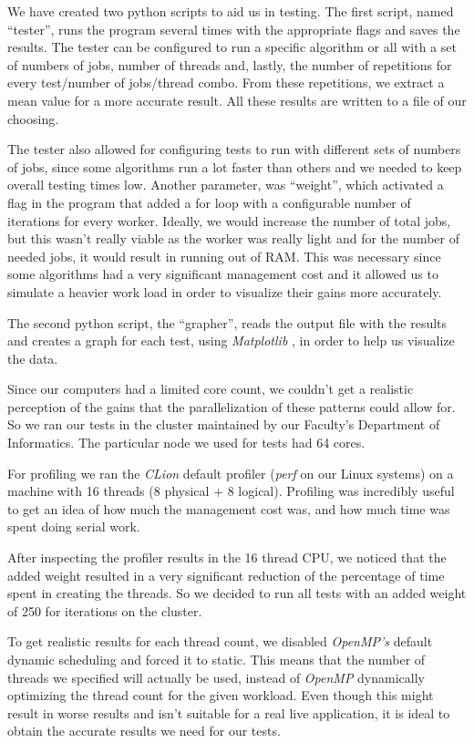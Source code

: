 \documentclass[10pt,journal]{IEEEtran}
\begin{document}
We have created two python scripts to aid us in testing. The first script, named “tester”, runs the program several times with the appropriate flags and saves the results. The tester can be configured to run a specific algorithm or all with a set of numbers of jobs, number of threads and, lastly, the number of repetitions for every test/number of jobs/thread combo. From these repetitions, we extract a mean value for a more accurate result. All these results are written to a file of our choosing.

The tester also allowed for configuring tests to run with different sets of numbers of jobs, since some algorithms run a lot faster than others and we needed to keep overall testing times low.  Another parameter, was “weight”, which activated a flag in the program that added a for loop with a configurable number of iterations for every worker. Ideally, we would increase the number of total jobs, but this wasn't really viable as the worker was really light and for the number of needed jobs, it would result in running out of RAM. This was necessary since some algorithms had a very significant management cost and it allowed us to simulate a heavier work load in order to visualize their gains more accurately. 

The second python script, the “grapher”, reads the output file with the results and creates a graph for each test, using \textit{Matplotlib} \cite{matplotlib}, in order to help us visualize the data. 

Since our computers had a limited core count, we couldn’t get a realistic perception of the gains that the parallelization of these patterns could allow for. So we ran our tests in the cluster maintained by our Faculty’s Department of Informatics. The particular node we used for tests had 64 cores.

For profiling we ran the \textit{CLion} default profiler (\textit{perf} on our Linux systems) on a machine with 16 threads (8 physical + 8 logical). Profiling was incredibly useful to get an idea of how much the management cost was, and how much time was spent doing serial work.

After inspecting the profiler results in the 16 thread CPU, we noticed that the added weight resulted in a very significant reduction of the percentage of time spent in creating the threads. So we decided to run all tests with an added weight of 250 for iterations on the cluster.

To get realistic results for each thread count, we disabled \textit{OpenMP's} default dynamic scheduling and forced it to static. This means that the number of threads we specified will actually be used, instead of \textit{OpenMP} dynamically optimizing the thread count for the given workload. Even though this might result in worse results and isn't suitable for a real live application, it is ideal to obtain the accurate results we need for our tests.
\end{document}
